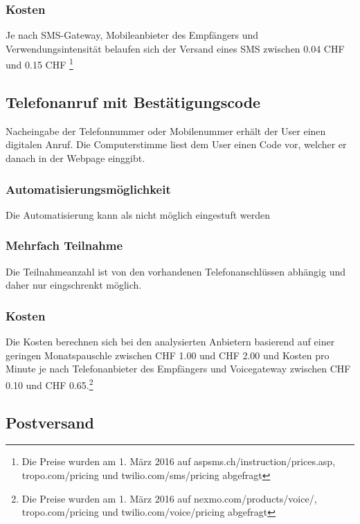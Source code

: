 \subsubsection{Kosten}\label{kosten-4}

Je nach SMS-Gateway, Mobileanbieter des Empfängers und
Verwendungsintensität belaufen sich der Versand eines SMS zwischen 0.04
CHF und 0.15 CHF \footnote{Die Preise wurden am 1. März 2016 auf
  aspsms.ch/instruction/prices.asp, tropo.com/pricing und
  twilio.com/sms/pricing abgefragt}

\subsection{Telefonanruf mit
Bestätigungscode}\label{telefonanruf-mit-bestuxe4tigungscode}

Nacheingabe der Telefonnummer oder Mobilenummer erhält der User einen
digitalen Anruf. Die Computerstimme liest dem User einen Code vor,
welcher er danach in der Webpage einggibt.

\subsubsection{Automatisierungsmöglichkeit}\label{automatisierungsmuxf6glichkeit-4}

Die Automatisierung kann als nicht möglich eingestuft werden

\subsubsection{Mehrfach Teilnahme}\label{mehrfach-teilnahme-4}

Die Teilnahmeanzahl ist von den vorhandenen Telefonanschlüssen abhängig
und daher nur eingschrenkt möglich.

\subsubsection{Kosten}\label{kosten-5}

Die Kosten berechnen sich bei den analysierten Anbietern basierend auf
einer geringen Monatspauschle zwischen CHF 1.00 und CHF 2.00 und Kosten
pro Minute je nach Telefonanbieter des Empfängers und Voicegateway
zwischen CHF 0.10 und CHF 0.65.\footnote{Die Preise wurden am 1. März
  2016 auf nexmo.com/products/voice/, tropo.com/pricing und
  twilio.com/voice/pricing abgefragt}

\subsection{Postversand}\label{postversand}

